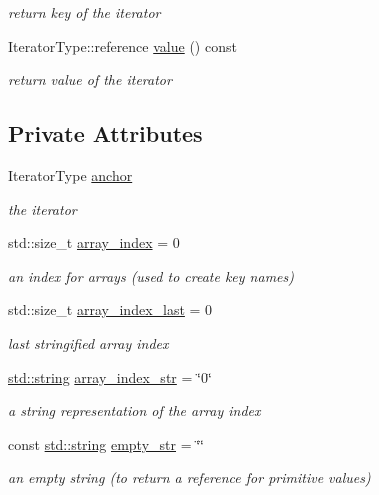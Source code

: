\begin{DoxyCompactItemize}
\begin{DoxyCompactList}\small\item\em return key of the iterator \end{DoxyCompactList}\item 
Iterator\+Type\+::reference \hyperlink{classnlohmann_1_1detail_1_1iteration__proxy__value_ad2fa3bf4e2598666dbf8d1b77c17d003}{value} () const 
\begin{DoxyCompactList}\small\item\em return value of the iterator \end{DoxyCompactList}\end{DoxyCompactItemize}
\subsection*{Private Attributes}
\begin{DoxyCompactItemize}
\item 
Iterator\+Type \hyperlink{classnlohmann_1_1detail_1_1iteration__proxy__value_a073741b6536b7a5166467a5515bc59cb}{anchor}
\begin{DoxyCompactList}\small\item\em the iterator \end{DoxyCompactList}\item 
std\+::size\+\_\+t \hyperlink{classnlohmann_1_1detail_1_1iteration__proxy__value_ad3d18c83aff5e9f4bdbf99385b29a39a}{array\+\_\+index} = 0
\begin{DoxyCompactList}\small\item\em an index for arrays (used to create key names) \end{DoxyCompactList}\item 
std\+::size\+\_\+t \hyperlink{classnlohmann_1_1detail_1_1iteration__proxy__value_aac6e7cc0c17242a0a42c14d1e714747c}{array\+\_\+index\+\_\+last} = 0
\begin{DoxyCompactList}\small\item\em last stringified array index \end{DoxyCompactList}\item 
\hyperlink{namespacenlohmann_1_1detail_a1ed8fc6239da25abcaf681d30ace4985ab45cffe084dd3d20d928bee85e7b0f21}{std\+::string} \hyperlink{classnlohmann_1_1detail_1_1iteration__proxy__value_a434324f7bed312c5b4aaedd3c6664e28}{array\+\_\+index\+\_\+str} = \char`\"{}0\char`\"{}
\begin{DoxyCompactList}\small\item\em a string representation of the array index \end{DoxyCompactList}\item 
const \hyperlink{namespacenlohmann_1_1detail_a1ed8fc6239da25abcaf681d30ace4985ab45cffe084dd3d20d928bee85e7b0f21}{std\+::string} \hyperlink{classnlohmann_1_1detail_1_1iteration__proxy__value_af970916a35c40e75e2317a6a08370324}{empty\+\_\+str} = \char`\"{}\char`\"{}
\begin{DoxyCompactList}\small\item\em an empty string (to return a reference for primitive values) \end{DoxyCompactList}\end{DoxyCompactItemize}


